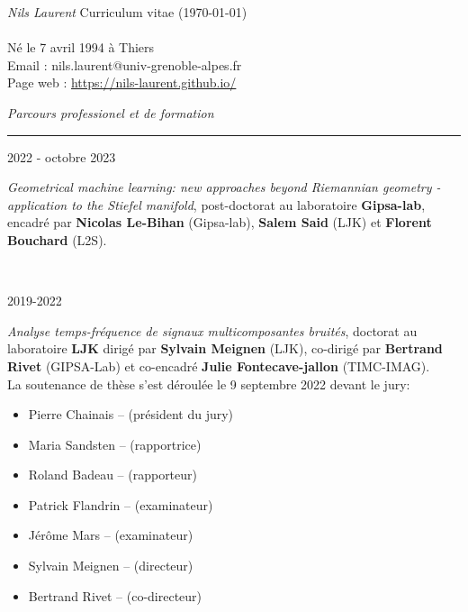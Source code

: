 \documentclass[a4paper,10pt, french]{article}
\begin{document}
\noindent
\textit{\Large \color{Black} Nils Laurent} \hfill {Curriculum vitae (\today)}\\
\vspace{0mm}\\
Né le 7 avril 1994 à Thiers\\
Email : nils.laurent@univ-grenoble-alpes.fr\\
Page web : \url{https://nils-laurent.github.io/}\\
\vspace{5mm}

\noindent
\textit{\Large \color{MyGray} \hspace{5mm} Parcours professionel et de formation}
\vspace{2mm}
{\color{DefaultGray}\hrule height .1pt}
\vspace{4mm}

\noindent
\begin{minipage}{0.20\textwidth}
	\color{MyGray} 2022 - octobre 2023
\end{minipage}
\hfill
\begin{minipage}{0.70\textwidth}
	\emph{Geometrical machine learning: new approaches beyond Riemannian geometry - application to the Stiefel manifold}, post-doctorat au laboratoire \textbf{Gipsa-lab}, encadré par \textbf{Nicolas Le-Bihan} (Gipsa-lab), \textbf{Salem Said} (LJK) et \textbf{Florent Bouchard} (L2S).
\end{minipage}\\
\vspace{2mm}

\noindent
\begin{minipage}{0.20\textwidth}
	\color{MyGray} 2019-2022
\end{minipage}
\hfill
\begin{minipage}{0.70\textwidth}
	\emph{Analyse temps-fréquence de signaux multicomposantes bruités}, doctorat au  laboratoire \textbf{LJK} dirigé par \textbf{Sylvain Meignen} (LJK), co-dirigé par \textbf{Bertrand Rivet} (GIPSA-Lab) et co-encadré \textbf{Julie Fontecave-jallon} (TIMC-IMAG).\\
	La soutenance de thèse s'est déroulée le 9 septembre 2022 devant le jury:
	\begin{itemize}
		\item[] Pierre Chainais -- (président du jury)
		\item[] Maria Sandsten -- (rapportrice)
		\item[] Roland Badeau -- (rapporteur)
		\item[] Patrick Flandrin -- (examinateur)
		\item[] Jérôme Mars -- (examinateur)
		\item[] Sylvain Meignen -- (directeur)
		\item[] Bertrand Rivet -- (co-directeur)
	\end{itemize}
\end{minipage}\\
\vspace{2mm}
\end{document}
